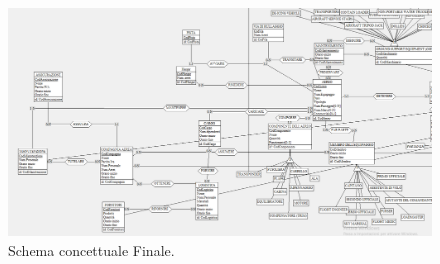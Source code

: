 \begin{figure}[H] %
	\centering
	\includegraphics[width=1.2\linewidth, height=1.2\textheight, keepaspectratio]{./img/Schema_Finale4.png}
	\caption{Schema concettuale Finale.}
	\label{fig:schema_finale4}
\end{figure}

\restoregeometry